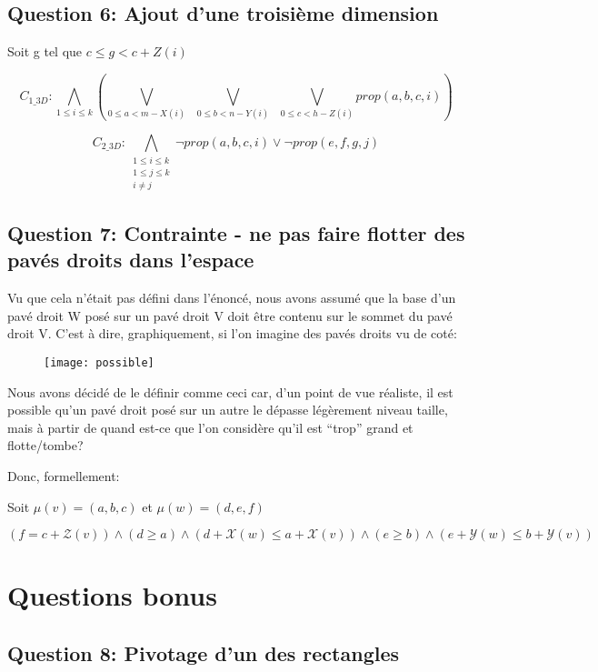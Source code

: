 \documentclass[a4paper,10pt]{article}
\begin{document}
\subsection{Question 6: Ajout d'une troisième dimension}

Soit g tel que $c \leq g < c + Z(i)$

$$C_{1\_3D} : \bigwedge_{1 \leq i \leq k} ( \bigvee_{0 \leq a < m - X(i)}\;\; \bigvee_{0 \leq b < n - Y(i)}\;\; \bigvee_{0 \leq c < h - Z(i)} prop(a,b,c,i)) $$

$$C_{2\_3D} : \bigwedge_{\substack{1 \leq i \leq k \\ 1 \leq j \leq k \\ i \neq j}} \neg prop(a,b,c,i) \lor \neg prop(e,f,g,j)$$


\newpage

\subsection{Question 7: Contrainte - ne pas faire flotter des pavés droits dans l'espace}

Vu que cela n'était pas défini dans l'énoncé, nous avons assumé que la base d'un pavé droit W posé sur un pavé droit V doit être contenu sur le sommet du pavé droit V. C'est à dire, graphiquement, si l'on imagine des pavés droits vu de coté:

\begin{figure}[htb!]
\centering
\texttt{[image: possible]}
\end{figure}

Nous avons décidé de le définir comme ceci car, d'un point de vue réaliste, il est possible qu'un pavé droit posé sur un autre le dépasse légèrement niveau taille, mais à partir de quand est-ce que l'on considère qu'il est ``trop'' grand et flotte/tombe?

Donc, formellement: 

Soit $\mu(v) = (a,b,c)$ et $\mu(w) = (d,e,f)$

$(f = c + \mathcal{Z}(v)) \land (d \geq a) \land (d+\mathcal{X}(w) \leq a+\mathcal{X}(v)) \land (e \geq b) \land(e+\mathcal{Y}(w) \leq b+\mathcal{Y}(v))$ 

\section{Questions bonus}

\subsection{Question 8: Pivotage d'un des rectangles}
\end{document}
